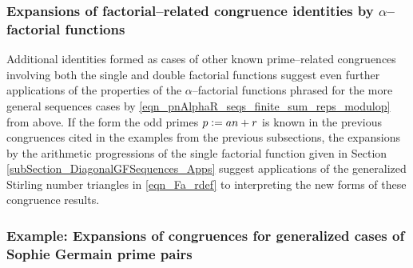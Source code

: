 \documentclass[12pt,reqno]{article}
\numberwithin{sfootnote}{section}
\numberwithin{equation}{section}
\theoremstyle{DefaultTheoremStyle}
\theoremstyle{definition}
\newcommand{\defequals}{\ensuremath{\vcentcolon=}}
\begin{document}
\subsubsection{Expansions of factorial--related congruence identities by 
               $\alpha$--factorial functions} 

Additional identities formed as cases of other known 
prime--related congruences involving both the 
single and double factorial functions suggest even further 
applications of the properties of the $\alpha$--factorial 
functions phrased for the more general sequences cases by 
\eqref{eqn_pnAlphaR_seqs_finite_sum_reps_modulop} from above. 
If the form the odd primes $p \defequals an+r$ is known 
in the previous congruences cited in the examples from the previous 
subsections, the 
expansions by the arithmetic progressions of the 
single factorial function given in 
Section \ref{subSection_DiagonalGFSequences_Apps} 
suggest applications of the generalized Stirling number triangles 
in \eqref{eqn_Fa_rdef} to interpreting the new forms of these 
congruence results. 

\subsubsection{Example: Expansions of congruences for 
               generalized cases of Sophie Germain prime pairs} 
\end{document}
